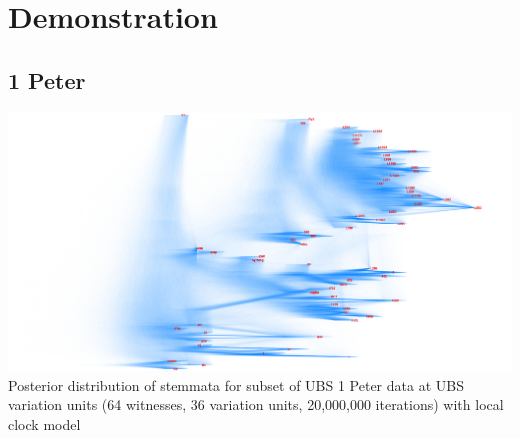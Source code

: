 \documentclass[10pt]{beamer}
\begin{document}
	\section{Demonstration}
	\subsection{1 Peter}
	\begin{frame}
		\begin{center}
			\includegraphics[width=\textwidth]{../img/ubs_1_peter_local_densitree.pdf}\\
			Posterior distribution of stemmata for subset of UBS 1 Peter data at UBS variation units (64 witnesses, 36 variation units, 20,000,000 iterations) with local clock model\\
		\end{center}
	\end{frame}
\end{document}
